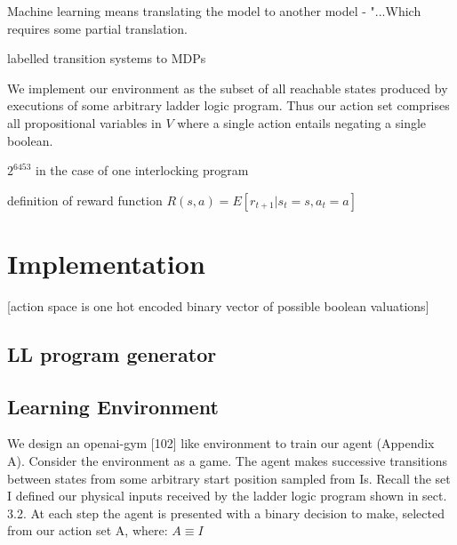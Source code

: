 \documentclass[runningheads]{llncs}
\begin{document}
Machine learning means translating the model to another model - "...Which requires some partial translation.


labelled transition systems to MDPs

We implement our environment as the subset of all reachable states produced by executions of some arbitrary ladder logic program.  Thus our action set comprises all propositional variables in $V$ where a single action entails negating a single boolean.

$2^{6453}$ in the case of one interlocking program

definition of reward function $R(s,a) = E\left[r_{t+1} | s_t = s, a_t = a\right]$
\section{Implementation}
[action space is one hot encoded binary vector of possible boolean valuations]


\subsection{LL program generator}
\subsection{Learning Environment}
 We design an openai-gym [102] like environment to train our agent (Appendix A).
Consider the environment as a game. The agent makes successive transitions between states from some arbitrary start position sampled from Is. Recall the set I  defined our physical inputs received by the ladder logic program shown in sect. 3.2. At each step the agent is presented with a binary decision to make, selected from our action set A, where: $A \equiv I$
\end{document}
